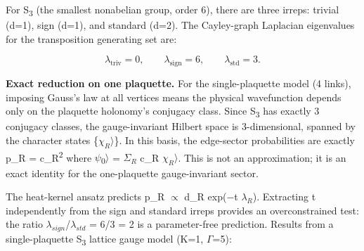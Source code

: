 \documentclass[11pt,a4paper]{article}
\theoremstyle{remark}
\begin{document}
For S\textsubscript{3} (the smallest nonabelian group, order 6), there are three irreps:
trivial (d=1), sign (d=1), and standard (d=2). The Cayley-graph Laplacian
eigenvalues for the transposition generating set are:

\[
\lambda_{\mathrm{triv}} = 0, \qquad \lambda_{\mathrm{sign}} = 6, \qquad
\lambda_{\mathrm{std}} = 3.
\]

\textbf{Exact reduction on one plaquette.} For the single-plaquette model (4 links),
imposing Gauss's law at all vertices means the physical wavefunction depends
only on the plaquette holonomy's conjugacy class. Since S\textsubscript{3} has exactly 3
conjugacy classes, the gauge-invariant Hilbert space is 3-dimensional, spanned
by the character states \{\textbar $\chi_R$\ensuremath{\rangle}\}. In this basis, the edge-sector
probabilities are exactly p\_R = \textbar c\_R\textbar\textsuperscript{2} where \textbar \ensuremath{\psi}\textsubscript{0}\ensuremath{\rangle} = $\Sigma_R$ c\_R
\textbar $\chi_R$\ensuremath{\rangle}. This is not an approximation; it is an exact identity for the
one-plaquette gauge-invariant sector.

The heat-kernel ansatz predicts p\_R \ensuremath{\propto} d\_R exp(\ensuremath{-}t $\lambda_R$). Extracting
t independently from the sign and standard irreps provides an overconstrained
test: the ratio $\lambda_{sign}$/$\lambda_{std}$ = 6/3 = 2 is a
parameter-free prediction. Results from a single-plaquette S\textsubscript{3} lattice gauge
model (K=1, \ensuremath{\Gamma}=5):
\end{document}
